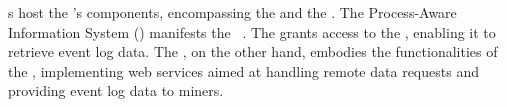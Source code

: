 s host the 's components, encompassing the  and the . 
The Process-Aware Information System () manifests the ~\cite{Dumas.etal/2018:FundamentalsofBPM}. %
%
%
The  grants access to the , enabling it to retrieve event log data. The , on the other hand, embodies the functionalities of the , implementing web services aimed at handling remote data requests and providing event log data to miners. %


